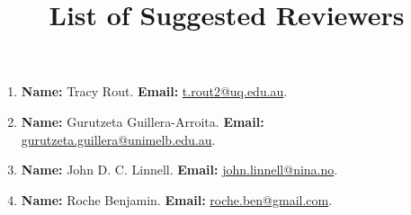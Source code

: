\documentclass[10pt]{article}
\title{List of Suggested Reviewers}
\date{}
\begin{document}
\maketitle

\begin{enumerate}
    \item \textbf{Name:} Tracy Rout. \textbf{Email:} \href{mailto:t.rout2@uq.edu.au}{t.rout2@uq.edu.au}.
    \item \textbf{Name:} Gurutzeta Guillera-Arroita. \textbf{Email:} \href{mailto:gurutzeta.guillera@unimelb.edu.au}{gurutzeta.guillera@unimelb.edu.au}.
    \item \textbf{Name:} John D. C. Linnell. \textbf{Email:} \href{mailto:john.linnell@nina.no}{john.linnell@nina.no}.
    \item \textbf{Name:} Roche Benjamin. \textbf{Email:} \href{mailto:roche.ben@gmail.com}{roche.ben@gmail.com}.
\end{enumerate}
\end{document}
